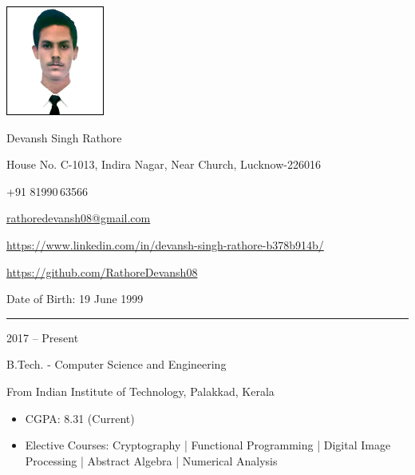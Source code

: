 \documentclass[a4paper,10pt]{article}
\newlength{\cvcolumngapwidth}
\newlength{\cvleftcolumnwidth}
\newlength{\cvrightcolumnwidth}
\newcommand{\cvnamestyle}[1]{{\Large\cvnamefont\textcolor{cvnamecolor}{#1}}}
\newcommand{\cvsectionstyle}[1]{{\normalsize\cvsectionfont\textcolor{cvsectioncolor}{#1}}}
\newcommand{\cvtitlestyle}[1]{{\large\cvtitlefont\textcolor{cvtitlecolor}{#1}}}
\newcommand{\cvdurationstyle}[1]{{\small\cvdurationfont\textcolor{cvdurationcolor}{#1}}}
\newlength{\cvafteritemskipamount}
\newlength{\cvaftersectionskipamount}
\newlength{\cvafternameskipamount}
\newlength{\cvafterpersonalinfolineskipamount}
\newlength{\cvaftertitleskipamount}
\newlength{\cvparskip}
\newcommand{\cvpersonalinfo}[2]{
    \begin{minipage}[t]{\cvleftcolumnwidth}
        \vspace{0mm} %
        \raggedleft #1
    \end{minipage}%
    \hspace{\cvcolumngapwidth}%
    \begin{minipage}[t]{\cvrightcolumnwidth}
        \vspace{0mm} %
        #2
    \end{minipage}

    \vspace{\cvafteritemskipamount}
}
\newcommand{\cvname}[1]{
    \cvnamestyle{#1}

    \vspace{\cvafternameskipamount}
}
\newcommand{\cvpersonalinfolinewithicon}[3]{
    \raisebox{.5\fontcharht\font`E-.5\height}{\texttt{[image: \#2]}}
    #3

    \vspace{\cvafterpersonalinfolineskipamount}
}
\newcommand{\cvsection}[1]{
    \begin{minipage}[t]{\cvleftcolumnwidth}
        \raggedleft\cvsectionstyle{#1}
    \end{minipage}%
    \hspace{\cvcolumngapwidth}%
    \begin{minipage}[t]{\cvrightcolumnwidth}
        \textcolor{cvrulecolor}{\rule{\cvrightcolumnwidth}{0.3mm}}
    \end{minipage}

    \vspace{\cvaftersectionskipamount}
}
\newcommand{\cvitem}[2]{
    \begin{minipage}[t]{\cvleftcolumnwidth}
        \raggedleft #1
    \end{minipage}%
    \hspace{\cvcolumngapwidth}%
    \begin{minipage}[t]{\cvrightcolumnwidth}
        \setlength{\parskip}{\cvparskip} #2
    \end{minipage}

    \vspace{\cvafteritemskipamount}
}
\newcommand{\cvtitle}[1]{
    \cvtitlestyle{#1}

    \vspace{\cvaftertitleskipamount}
    \vspace{-\cvparskip}
}
\begin{document}

\cvpersonalinfo{
    \includegraphics[height=36mm]{new2.jpg}
}{
    \cvname{Devansh Singh Rathore}

    \cvpersonalinfolinewithicon{height=4mm}{072-location.pdf}{
        House No. C-1013, Indira Nagar, Near Church, Lucknow-226016
    }

    \cvpersonalinfolinewithicon{height=4mm}{067-phone.pdf}{
        +91 81990\,63566\
    }

    \cvpersonalinfolinewithicon{height=4mm}{070-envelop.pdf}{
        \href{mailto:rathoredevansh08@gmail.com}{rathoredevansh08@gmail.com}
    }

    \cvpersonalinfolinewithicon{height=4mm}{458-linkedin.pdf}{
        \url{https://www.linkedin.com/in/devansh-singh-rathore-b378b914b/}
    }
    
    \cvpersonalinfolinewithicon{height=4mm}{github.png.pdf}{
        \url{https://github.com/RathoreDevansh08}
    }

    Date of Birth:  19 June 1999
}




%




\cvsection{EDUCATION}

\cvitem{
    \cvdurationstyle{2017 -- Present}
}{
    \cvtitle{B.Tech. - Computer Science and Engineering}

    From Indian Institute of Technology, Palakkad, Kerala

    \begin{itemize}[leftmargin=*]
        \item CGPA: 8.31 (Current)
        \item Elective Courses: Cryptography | Functional Programming | Digital Image Processing | Abstract Algebra | Numerical Analysis 
    \end{itemize}
}
\end{document}
